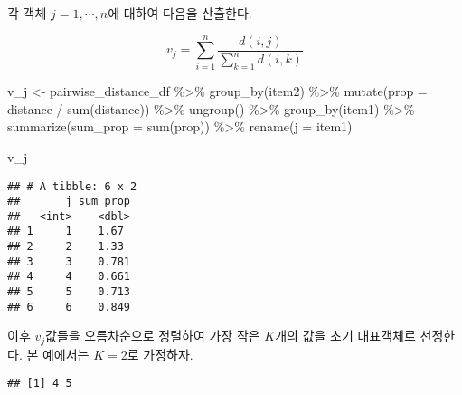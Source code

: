 \documentclass[
]{book}
\newenvironment{Shaded}{\begin{snugshade}}{\end{snugshade}}
\newcommand{\AttributeTok}[1]{\textcolor[rgb]{0.77,0.63,0.00}{#1}}
\newcommand{\DecValTok}[1]{\textcolor[rgb]{0.00,0.00,0.81}{#1}}
\newcommand{\FunctionTok}[1]{\textcolor[rgb]{0.00,0.00,0.00}{#1}}
\newcommand{\NormalTok}[1]{#1}
\newcommand{\OtherTok}[1]{\textcolor[rgb]{0.56,0.35,0.01}{#1}}
\newcommand{\SpecialCharTok}[1]{\textcolor[rgb]{0.00,0.00,0.00}{#1}}
\begin{document}
각 객체 \(j = 1, \cdots, n\)에 대하여 다음을 산출한다.

\begin{equation*}
v_j = \sum_{i = 1}^{n} \frac{d(i, j)}{\sum_{k = 1}^{n} d(i, k)}
\end{equation*}

\begin{Shaded}
\begin{Highlighting}[]
\NormalTok{v\_j }\OtherTok{\textless{}{-}}\NormalTok{ pairwise\_distance\_df }\SpecialCharTok{\%\textgreater{}\%}
  \FunctionTok{group\_by}\NormalTok{(item2) }\SpecialCharTok{\%\textgreater{}\%}
  \FunctionTok{mutate}\NormalTok{(}\AttributeTok{prop =}\NormalTok{ distance }\SpecialCharTok{/} \FunctionTok{sum}\NormalTok{(distance)) }\SpecialCharTok{\%\textgreater{}\%}
  \FunctionTok{ungroup}\NormalTok{() }\SpecialCharTok{\%\textgreater{}\%}
  \FunctionTok{group\_by}\NormalTok{(item1) }\SpecialCharTok{\%\textgreater{}\%}
  \FunctionTok{summarize}\NormalTok{(}\AttributeTok{sum\_prop =} \FunctionTok{sum}\NormalTok{(prop)) }\SpecialCharTok{\%\textgreater{}\%}
  \FunctionTok{rename}\NormalTok{(}\AttributeTok{j =}\NormalTok{ item1)}

\NormalTok{v\_j}
\end{Highlighting}
\end{Shaded}

\begin{verbatim}
## # A tibble: 6 x 2
##       j sum_prop
##   <int>    <dbl>
## 1     1    1.67 
## 2     2    1.33 
## 3     3    0.781
## 4     4    0.661
## 5     5    0.713
## 6     6    0.849
\end{verbatim}

이후 \(v_j\)값들을 오름차순으로 정렬하여 가장 작은 \(K\)개의 값을 초기 대표객체로 선정한다. 본 예에서는 \(K = 2\)로 가정하자.

\begin{Shaded}
\end{Shaded}

\begin{verbatim}
## [1] 4 5
\end{verbatim}
\end{document}
